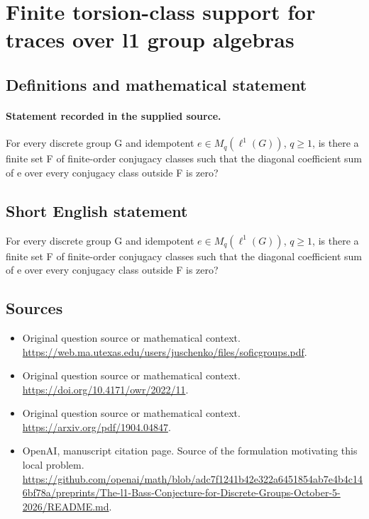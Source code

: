 \documentclass[11pt]{article}
\begin{document}
\section*{Finite torsion-class support for traces over l1 group algebras}\label{30007001}
\subsection{Definitions and mathematical statement}
\paragraph{Statement recorded in the supplied source.}
For every discrete group G and idempotent $e\in M_q(\ell ^{1}(G))$, $q\geq 1$, is there a finite set F of finite-order conjugacy classes such that the diagonal coefficient sum of e over every conjugacy class outside F is zero?
\subsection{Short English statement}
For every discrete group G and idempotent $e\in M_q(\ell ^{1}(G))$, $q\geq 1$, is there a finite set F of finite-order conjugacy classes such that the diagonal coefficient sum of e over every conjugacy class outside F is zero?
\subsection{Sources}
\begin{itemize}
\item[S1] Original question source or mathematical context.
\url{https://web.ma.utexas.edu/users/juschenko/files/soficgroups.pdf}.
\item[S2] Original question source or mathematical context.
\url{https://doi.org/10.4171/owr/2022/11}.
\item[S3] Original question source or mathematical context.
\url{https://arxiv.org/pdf/1904.04847}.
\item[S4] OpenAI, manuscript citation page. Source of the formulation motivating this local problem.
\url{https://github.com/openai/math/blob/adc7f1241b42e322a6451854ab7e4b4c146bf78a/preprints/The-l1-Bass-Conjecture-for-Discrete-Groups-October-5-2026/README.md}.
\end{itemize}
\end{document}

